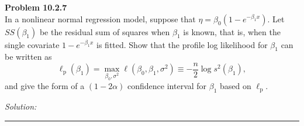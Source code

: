 \documentclass[a4paper, 11pt]{article}
\newenvironment{problem}[2][Problem]
    { \begin{mdframed}[backgroundcolor=gray!20] \textbf{#1 #2} \\}
    {  \end{mdframed}}
\newenvironment{solution}
    {\textit{Solution:}}
    {}
\begin{document}


\begin{problem}{10.2.7}
    In a nonlinear normal regression model, suppose that $\eta=\beta_{0}\left(1-e^{-\beta_{1} x}\right) .$ Let $S S\left(\beta_{1}\right)$ be the residual sum of squares when $\beta_{1}$ is known, that is, when the single covariate $1-e^{-\beta_{1} x}$ is fitted. Show that the profile log likelihood for $\beta_{1}$ can be written as
    \[
    \ell_{\mathrm{p}}\left(\beta_{1}\right)=\max _{\beta_{0}, \sigma^{2}} \ell\left(\beta_{0}, \beta_{1}, \sigma^{2}\right) \equiv-\frac{n}{2} \log s^{2}\left(\beta_{1}\right),
    \]
    and give the form of a $(1-2 \alpha)$ confidence interval for $\beta_{1}$ based on $\ell_{\mathrm{p}}.$

\end{problem}
\begin{solution}

\end{solution}

\noindent\rule{7in}{2.8pt}

\end{document}

